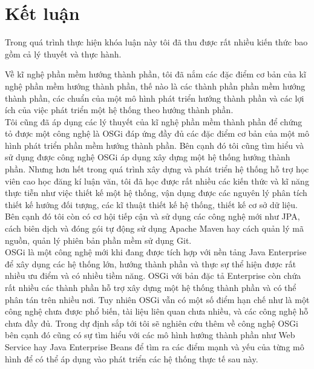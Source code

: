 \chapter{Kết luận}
Trong quá trình thực hiện khóa luận này tôi đã thu được rất nhiều kiến thức bao gồm cả lý thuyết và thực hành.

Về kĩ nghệ phần mềm hướng thành phần, tôi đã nắm các đặc điểm cơ bản của kĩ nghệ phần mềm hướng thành phần, thế nào là các thành phần phần mềm hướng thành phần, các chuẩn của một mô hình phát triển hướng thành phần và các lợi ích của việc phát triển một hệ thống theo hướng thành phần.\\

Tôi cũng đã áp dụng các lý thuyết của kĩ nghệ phần mềm thành phần để chứng tỏ được một công nghệ là OSGi đáp ứng đầy đủ các đặc điểm cơ bản của một mô hình phát triển phần mềm hướng thành phần. Bên cạnh đó tôi cũng tìm hiểu và sử dụng được công nghệ OSGi áp dụng xây dựng một hệ thống hướng thành phần. Nhưng hơn hết trong quá trình xây dựng và phát triển hệ thống hỗ trợ học viên cao học đăng kí luận văn, tôi đã học được rất nhiều các kiến thức và kĩ năng thực tiễn như việc thiết kế một hệ thống, vận dụng được các nguyên lý phân tích thiết kế hướng đối tượng, các kĩ thuật thiết kế hệ thống, thiết kế cơ sở dữ liệu. Bên cạnh đó tôi còn có cơ hội tiếp cận và sử dụng các công nghệ mới như JPA, cách biên dịch và đóng gói tự động sử dụng Apache Maven hay cách quản lý mã nguồn, quản lý phiên bản phần mềm sử dụng Git. \\

OSGi là một công nghệ mới khi đang được tích hợp với nền tảng Java Enterprise để xây dụng các hệ thống lớn, hướng thành phần và thực sự thể hiện được rất nhiều ưu điểm và có nhiều tiềm năng. OSGi với bản đặc tả Enterprise còn chứa rất nhiều các thành phần hỗ trợ xây dựng một hệ thống thành phần và có thể phân tán trên nhiều nơi. Tuy nhiên OSGi vẫn có một số điểm hạn chế như là một công nghệ chưa được phổ biến, tài liệu liên quan chưa nhiều, và các công nghệ hỗ chưa đầy đủ. Trong dự định sắp tới tôi sẽ nghiên cứu thêm về công nghệ OSGi bên cạnh đó cũng có sự tìm hiểu với các mô hình hướng thành phần như Web Service hay Java Enterprise Beans để tìm ra các điểm mạnh và yếu của từng mô hình để có thể áp dụng vào phát triển các hệ thống thực tế sau này.